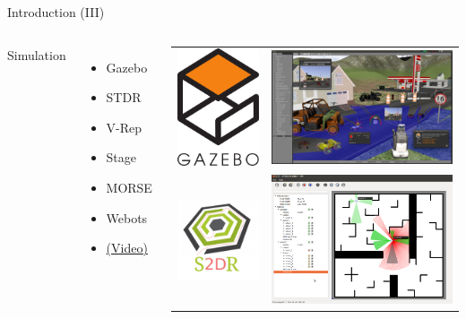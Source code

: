 \documentclass[10pt,compress]{beamer} %
\begin{document}
\begin{frame}{Introduction (III)}
    \begin{columns}
		Simulation

 	 	\begin{itemize}
		\item Gazebo
        \item STDR
        \item V-Rep
        \item Stage
		\item MORSE
		\item Webots
        \item[] \href{https://www.youtube.com/watch?v=0uifKcF0TRU}{(Video)}
		\end{itemize}


        \begin{tabular}{cc}
            \includegraphics[width=0.2\linewidth]{figs/gazebo.png}&
            \includegraphics[width=0.6\linewidth]{figs/gazeboScreen.png} \\
            \includegraphics[width=0.3\linewidth]{figs/stdr.png}&
            \includegraphics[width=0.6\linewidth]{figs/stdrScreen.png} \\

\end{tabular}
\end{columns}
\end{frame}
\end{document}
